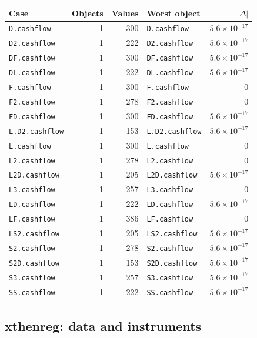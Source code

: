 \documentclass[10.5pt,a4paper]{article}
\begin{document}
\begin{longtable}{@{}p{3.6cm}rrp{4.9cm}r@{}}
\toprule
Case & Objects & Values & Worst object & $|\Delta|$ \\
\midrule
\endhead
\texttt{D.cashflow} & 1 & 300 & \texttt{D.cashflow} & $5.6\times10^{-17}$ \\
\texttt{D2.cashflow} & 1 & 222 & \texttt{D2.cashflow} & $5.6\times10^{-17}$ \\
\texttt{DF.cashflow} & 1 & 300 & \texttt{DF.cashflow} & $5.6\times10^{-17}$ \\
\texttt{DL.cashflow} & 1 & 222 & \texttt{DL.cashflow} & $5.6\times10^{-17}$ \\
\texttt{F.cashflow} & 1 & 300 & \texttt{F.cashflow} & 0 \\
\texttt{F2.cashflow} & 1 & 278 & \texttt{F2.cashflow} & 0 \\
\texttt{FD.cashflow} & 1 & 300 & \texttt{FD.cashflow} & $5.6\times10^{-17}$ \\
\texttt{L.D2.cashflow} & 1 & 153 & \texttt{L.D2.cashflow} & $5.6\times10^{-17}$ \\
\texttt{L.cashflow} & 1 & 300 & \texttt{L.cashflow} & 0 \\
\texttt{L2.cashflow} & 1 & 278 & \texttt{L2.cashflow} & 0 \\
\texttt{L2D.cashflow} & 1 & 205 & \texttt{L2D.cashflow} & $5.6\times10^{-17}$ \\
\texttt{L3.cashflow} & 1 & 257 & \texttt{L3.cashflow} & 0 \\
\texttt{LD.cashflow} & 1 & 222 & \texttt{LD.cashflow} & $5.6\times10^{-17}$ \\
\texttt{LF.cashflow} & 1 & 386 & \texttt{LF.cashflow} & 0 \\
\texttt{LS2.cashflow} & 1 & 205 & \texttt{LS2.cashflow} & $5.6\times10^{-17}$ \\
\texttt{S2.cashflow} & 1 & 278 & \texttt{S2.cashflow} & $5.6\times10^{-17}$ \\
\texttt{S2D.cashflow} & 1 & 153 & \texttt{S2D.cashflow} & $5.6\times10^{-17}$ \\
\texttt{S3.cashflow} & 1 & 257 & \texttt{S3.cashflow} & $5.6\times10^{-17}$ \\
\texttt{SS.cashflow} & 1 & 222 & \texttt{SS.cashflow} & $5.6\times10^{-17}$ \\
\bottomrule
\end{longtable}

\subsection*{xthenreg: data and instruments}
\end{document}
